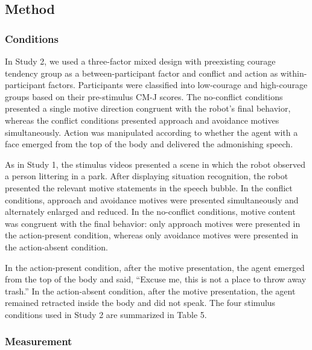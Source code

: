 \documentclass[utf8]{FrontiersinHarvard}
\begin{document}
\subsection{Method}\label{method-1}

\subsubsection{Conditions}\label{conditions-1}

In Study 2, we used a three-factor mixed design with preexisting courage tendency group as a between-participant factor and conflict and action as within-participant factors. Participants were classified into low-courage and high-courage groups based on their pre-stimulus CM-J scores. The no-conflict conditions presented a single motive direction congruent with the robot's final behavior, whereas the conflict conditions presented approach and avoidance motives simultaneously. Action was manipulated according to whether the agent with a face emerged from the top of the body and delivered the admonishing speech.

As in Study 1, the stimulus videos presented a scene in which the robot observed a person littering in a park. After displaying situation recognition, the robot presented the relevant motive statements in the speech bubble. In the conflict conditions, approach and avoidance motives were presented simultaneously and alternately enlarged and reduced. In the no-conflict conditions, motive content was congruent with the final behavior: only approach motives were presented in the action-present condition, whereas only avoidance motives were presented in the action-absent condition.

In the action-present condition, after the motive presentation, the agent emerged from the top of the body and said, ``Excuse me, this is not a place to throw away trash.'' In the action-absent condition, after the motive presentation, the agent remained retracted inside the body and did not speak. The four stimulus conditions used in Study 2 are summarized in Table 5.

\subsubsection{Measurement}\label{measurement-1}
\end{document}
